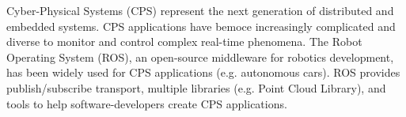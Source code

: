 \documentclass{sig-alternate-ipsn13}
\begin{document}
{%
}

\maketitle



Cyber-Physical Systems (CPS) represent the next generation of distributed and embedded systems. CPS applications have bemoce increasingly complicated and diverse to monitor and control complex real-time phenomena. The Robot Operating System (ROS), an open-source middleware for robotics development, has been widely used for CPS applications (e.g. autonomous cars). ROS provides publish/subscribe transport, multiple libraries (e.g. Point Cloud Library), and tools to help software-developers create CPS applications.
\end{document}
